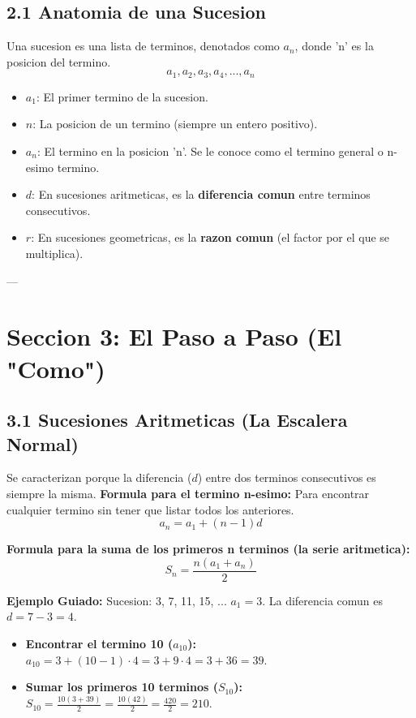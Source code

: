 \documentclass[12pt,a4paper]{article}
\begin{document}
\subsection*{2.1 Anatomia de una Sucesion}
Una sucesion es una lista de terminos, denotados como $a_n$, donde 'n' es la posicion del termino.
$$ a_1, a_2, a_3, a_4, ..., a_n $$
\begin{itemize}
    \item $a_1$: El primer termino de la sucesion.
    \item $n$: La posicion de un termino (siempre un entero positivo).
    \item $a_n$: El termino en la posicion 'n'. Se le conoce como el termino general o n-esimo termino.
    \item $d$: En sucesiones aritmeticas, es la \textbf{diferencia comun} entre terminos consecutivos.
    \item $r$: En sucesiones geometricas, es la \textbf{razon comun} (el factor por el que se multiplica).
\end{itemize}

---

\section*{Seccion 3: El Paso a Paso (El "Como")}

\subsection*{3.1 Sucesiones Aritmeticas (La Escalera Normal)}
Se caracterizan porque la diferencia ($d$) entre dos terminos consecutivos es siempre la misma.
\textbf{Formula para el termino n-esimo:} Para encontrar cualquier termino sin tener que listar todos los anteriores.
$$ a_n = a_1 + (n-1)d $$

\textbf{Formula para la suma de los primeros n terminos (la serie aritmetica):}
$$ S_n = \frac{n(a_1 + a_n)}{2} $$

\textbf{Ejemplo Guiado:}
Sucesion: 3, 7, 11, 15, ...
$a_1 = 3$. La diferencia comun es $d = 7 - 3 = 4$.
\begin{itemize}
    \item \textbf{Encontrar el termino 10 ($a_{10}$):}
    $a_{10} = 3 + (10-1) \cdot 4 = 3 + 9 \cdot 4 = 3 + 36 = 39$.
    \item \textbf{Sumar los primeros 10 terminos ($S_{10}$):}
    $S_{10} = \frac{10(3 + 39)}{2} = \frac{10(42)}{2} = \frac{420}{2} = 210$.
\end{itemize}
\end{document}
